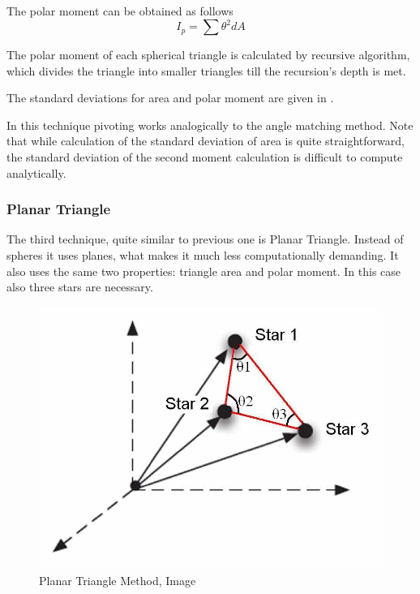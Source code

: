 \documentclass[12pt,a4paper,oneside]{article}
\begin{document}
The polar moment can be obtained as follows
\begin{equation}
I_p = \sum\theta^2dA
\end{equation}

The polar moment of each spherical triangle is calculated by recursive algorithm, which divides the triangle into smaller triangles till the recursion's depth is met.

The standard deviations for area and polar moment are given in \citet{cole2004fast}.

In this technique pivoting works analogically to the angle matching method. Note that while calculation of the standard deviation of area is quite straightforward, the standard deviation of the second moment calculation is difficult to compute analytically.

\subsubsection{Planar Triangle}

The third technique, quite similar to previous one is Planar Triangle. Instead of spheres it uses planes, what makes it much less computationally demanding. It also uses the same two properties: triangle area and polar moment. In this case also three stars are necessary\cite{cole2006fast}.

\begin{figure}[ht]
\includegraphics[scale=0.30]{planar_triangle_method.jpg}
\centering
\caption{Planar Triangle Method, Image \citet{cole2006fast}}
\label{fig:planar_triangle_method}
\end{figure}
\end{document}
